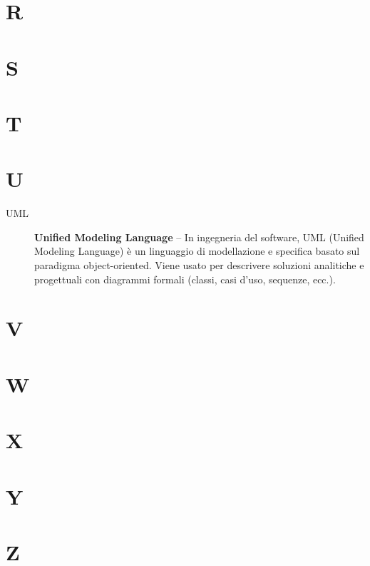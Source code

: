 \section*{R}


\section*{S}


\section*{T}


\section*{U}
\begin{description}
\item[UML] \textbf{Unified Modeling Language} -- In ingegneria del software, UML (Unified Modeling Language) è un linguaggio di modellazione e specifica basato sul paradigma object-oriented. Viene usato per descrivere soluzioni analitiche e progettuali con diagrammi formali (classi, casi d'uso, sequenze, ecc.).


\end{description}


\section*{V}


\section*{W}


\section*{X}


\section*{Y}


\section*{Z}

